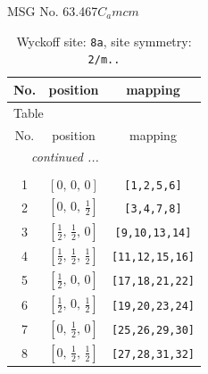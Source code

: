 \documentclass[fleqn,8pt]{jsarticle}
\begin{document}
\setcounter{MaxMatrixCols}{32}

\renewcommand{\tablename}{Table~}
\renewcommand{\figurename}{Figure~}
\begin{center}
\LARGE
MSG No. 63.467\quad$C_{a}mcm$
\end{center}
\renewcommand{\arraystretch}{1.2}
\begin{longtable}{ccc}
\caption{Wyckoff site: {\tt 8a}, site symmetry: {\tt 2/m..}}
 \\
 \hline \hline
No. & position & mapping \\ \hline \endfirsthead

\multicolumn{2}{l}{\tablename\ \thetable{}} \\
 \hline \hline
No. & position & mapping \\ \hline \endhead

 \hline \hline
\multicolumn{2}{r}{\footnotesize\it continued ...} \\ \endfoot

 \hline \hline
\multicolumn{2}{r}{} \\ \endlastfoot

1 & $\left[ 0,\, 0,\, 0 \right]$ & {\tt [1,2,5,6]} \\ \hline
2 & $\left[ 0,\, 0,\, \frac{1}{2} \right]$ & {\tt [3,4,7,8]} \\ \hline
3 & $\left[ \frac{1}{2},\, \frac{1}{2},\, 0 \right]$ & {\tt [9,10,13,14]} \\ \hline
4 & $\left[ \frac{1}{2},\, \frac{1}{2},\, \frac{1}{2} \right]$ & {\tt [11,12,15,16]} \\ \hline
5 & $\left[ \frac{1}{2},\, 0,\, 0 \right]$ & {\tt [17,18,21,22]} \\ \hline
6 & $\left[ \frac{1}{2},\, 0,\, \frac{1}{2} \right]$ & {\tt [19,20,23,24]} \\ \hline
7 & $\left[ 0,\, \frac{1}{2},\, 0 \right]$ & {\tt [25,26,29,30]} \\ \hline
8 & $\left[ 0,\, \frac{1}{2},\, \frac{1}{2} \right]$ & {\tt [27,28,31,32]} \\
\end{longtable}
\renewcommand{\arraystretch}{1.2}
\end{document}
